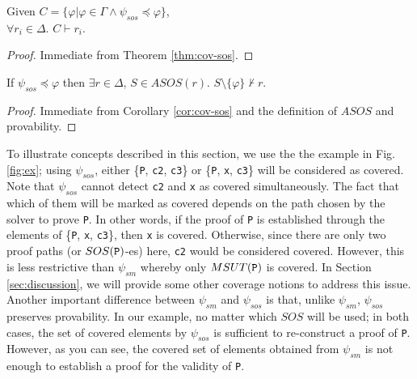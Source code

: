 \begin{coroll}
\label{cor:cov-sos}
Given $C = \{\varphi | \varphi \in \Gamma \wedge  \psi_{sos} \preccurlyeq \varphi \}$, \\
$\forall r_i \in \Delta$. $C \vdash r_i$.
\end{coroll}
\begin{proof}
Immediate from Theorem \ref{thm:cov-sos}.
\end{proof}
\vspace{2mm}

\begin{theorem}
\label{thm:sos-r}
If $\psi_{sos} \preccurlyeq \varphi$ then $\exists r \in \Delta$, $S \in ASOS(r)$.
$S \setminus \{\varphi \} \nvdash r$.
\end{theorem}
\begin{proof}
Immediate from Corollary \ref{cor:cov-sos} and the definition of $ASOS$ and provability.
\end{proof}
\vspace{2mm}
To illustrate concepts described in this section, we use the the example in Fig. \ref{fig:ex}; 
using $\psi_{sos}$, either \{{\tt P}, {\tt c2}, {\tt c3}\} or
 \{{\tt P}, {\tt x}, {\tt c3}\} will be considered as covered. Note that
 $\psi_{sos}$ cannot detect {\tt c2} and {\tt x} as covered simultaneously. 
 The fact that which of them will be marked as covered depends on 
 the path chosen by the solver to prove {\tt P}. In other words, 
 if the proof of {\tt P} is established through the elements of \{{\tt P}, {\tt x}, {\tt c3}\}, 
 then {\tt x} is covered. Otherwise, since there are only two proof paths (or $SOS({\tt P})$-es) 
 here, {\tt c2} would be considered covered. However, this is less restrictive than $\psi_{sm}$ whereby only $MSUT({\tt P})$ is covered. In Section \ref{sec:discussion}, we will provide some other coverage notions to address this issue.
 Another important difference between $\psi_{sm}$ and $\psi_{sos}$ is that, unlike $\psi_{sm}$,
 $\psi_{sos}$ preserves provability. In our example, no matter which $SOS$ will be used;
 in both cases, the set of covered elements by $\psi_{sos}$ is sufficient to re-construct a proof of {\tt P}.
 However, as you can see, the covered set of elements obtained from $\psi_{sm}$ is not
 enough to establish a proof for the validity of {\tt P}.
